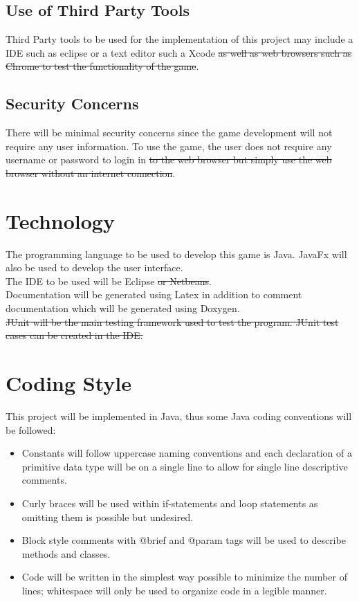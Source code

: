 \documentclass{article}
\begin{document}
\subsection{Use of Third Party Tools} 
Third Party tools to be used for the implementation of this project may include a IDE such as eclipse or a text editor such a Xcode \sout{ as well as web browsers such as Chrome to test the functionality of the game}. 

\subsection{Security Concerns}
There will be minimal security concerns since the game development will not require any user information. To use the game, the user does not require any username or password to login in \sout{to the web browser but simply use the web browser without an internet connection}.

\section{Technology}
The programming language to be used to develop this game is Java. JavaFx will also be used to develop the user interface. 
\\
The IDE to be used will be Eclipse \sout{or Netbeans}.
\\
Documentation will be generated using Latex in addition to comment documentation which will be generated using Doxygen. 
\\
\sout{JUnit will be the main testing framework used to test the program. JUnit test cases can be created in the IDE. }

\section{Coding Style}
This project will be implemented in Java, thus some Java coding conventions will be followed:
\begin{itemize}
\item Constants will follow uppercase naming conventions and each declaration of a primitive data type will be on a single line to allow for single line descriptive comments.
\item Curly braces will be used within if-statements and loop statements as omitting them is possible but undesired. 
\item Block style comments with @brief and @param tags will be used to describe methods and classes. 
\item Code will be written in the simplest way possible to minimize the number of lines; whitespace will only be used to organize code in a legible manner.
\end{itemize}
\end{document}
